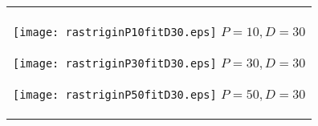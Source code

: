\documentclass[a4paper,11pt,oneside,openany]{jsbook}
\begin{document}
\begin{figure}[htbp]
  \begin{center}
    \begin{tabular}{c}


      \begin{minipage}{0.33\hsize}
        \begin{center}
          \texttt{[image: rastriginP10fitD30.eps]}
          \hspace{1.2cm}$P=10, D=30
$        \end{center}
      \end{minipage}

      \begin{minipage}{0.33\hsize}
        \begin{center}
          \texttt{[image: rastriginP30fitD30.eps]}
          \hspace{1.2cm}$P=30, D=30
$        \end{center}
      \end{minipage}

      \begin{minipage}{0.33\hsize}
        \begin{center}
          \texttt{[image: rastriginP50fitD30.eps]}
          \hspace{1.2cm}$P=50, D=30
$        \end{center}
      \end{minipage}
    \end{tabular}
  \end{center}
\end{figure}
\end{document}
